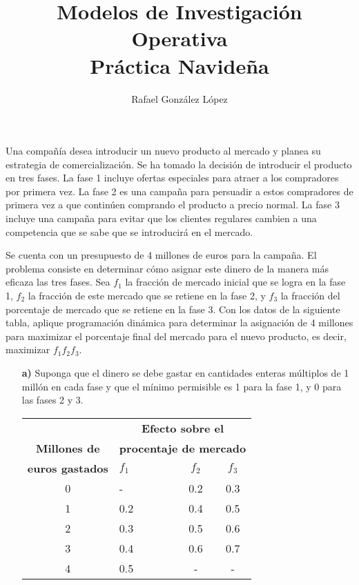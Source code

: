 \documentclass[twoside]{article}
\begin{document}
\title{Modelos de Investigación Operativa\\ Práctica Navideña}
\author{Rafael González López}
\maketitle



\begin{ejercicio}{1}
Una compañía desea introducir un nuevo producto al mercado y planea su estrategia de comercialización. Se ha tomado la decisión de introducir el producto en tres fases. La fase 1 incluye ofertas especiales para atraer a los compradores por primera vez. La fase 2 es una campaña para persuadir a estos compradores de primera vez a que continúen comprando el producto a precio normal. La fase 3 incluye una campaña para evitar que los clientes regulares cambien a una competencia que se sabe que se introducirá en el mercado.

Se cuenta con un presupuesto de 4 millones de euros para la campaña. El problema consiste en determinar cómo asignar este dinero de la manera más eficaza las tres fases. Sea $f_1$ la fracción de mercado inicial que se logra en la fase 1, $f_2$ la fracción de este mercado que se retiene en la fase 2, y $f_3$ la fracción del porcentaje de mercado que se retiene en la fase 3. Con los datos de la siguiente tabla, aplique programación dinámica para determinar la asignación de 4 millones para maximizar el porcentaje final del mercado para el nuevo producto, es decir, maximizar $f_1f_2f_3$. 
\begin{itemize}
\item[\textbf{a)}] Suponga que el dinero se debe gastar en cantidades enteras múltiplos de 1 millón en cada fase y que el mínimo permisible es 1 para la fase 1, y 0 para las fases 2 y 3.
\begin{center}
\begin{tabular}{c|lcc}
 & \multicolumn{3}{c}{\textbf{Efecto sobre el}}\\
\textbf{Millones de } & \multicolumn{3}{c}{\textbf{procentaje de mercado}} \\\cline{2-4}
\textbf{euros gastados} & $f_1\qquad$ & $f_2$ & $f_3$\\
\hline
0 & - & 0.2   & 0.3\\
1 & 0.2 & 0.4 & 0.5\\
2 & 0.3 & 0.5 & 0.6\\
3 & 0.4 & 0.6 & 0.7\\
4 & 0.5 & - & -
\end{tabular}
\end{center}


\end{itemize}
\end{ejercicio}
\end{document}
